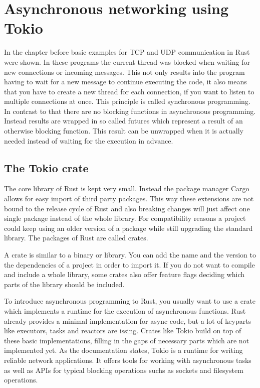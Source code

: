 
\section{Asynchronous networking using Tokio} \label{asynchronous-networking}
In the chapter before basic examples for TCP and UDP communication in Rust were shown. In these programs the current
thread was blocked when waiting for new connections or incoming messages. This not only results into the program having
to wait for a new message to continue executing the code, it also means that you have to create a new thread for each
connection, if you want to listen to multiple connections at once. This principle is called synchronous programming. In
contrast to that there are no blocking functions in asynchronous programming. Instead results are wrapped in so called
futures which represent a result of an otherwise blocking function. This result can be unwrapped when it is actually
needed instead of waiting for the execution in advance. \cite{async-rust}

\subsection{The Tokio crate}
The core library of Rust is kept very small. Instead the package manager Cargo allows for easy import of third party
packages. This way these extensions are not bound to the release cycle of Rust and also breaking changes will just
affect one single package instead of the whole library. For compatibility reasons a project could keep using an older
version of a package while still upgrading the standard library. The packages of Rust are called crates.

A crate is similar to a binary or library. You can add the name and the version to the dependencies of a project in
order to import it. If you do not want to compile and include a whole library, some crates also offer feature flags
deciding which parts of the library should be included.

To introduce asynchronous programming to Rust, you usually want to use a crate which implements a runtime for the
execution of asynchronous functions. Rust already provides a minimal implementation for async code, but a lot of
keyparts like executors, tasks and reactors are issing. Crates like Tokio build on top of these basic implementations,
filling in the gaps of necessary parts which are not implemented yet. As the documentation \cite{tokio-doc} states,
Tokio is a runtime for writing reliable network applications. It offers tools for working with asynchronous tasks as
well as APIs for typical blocking operations suchs as sockets and filesystem operations.

